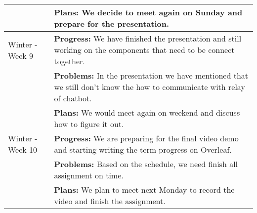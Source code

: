 \begin{longtable}[ht]{| p{1.5cm} | p{13.5cm} |}
     \\ & \textbf{Plans:}
     We decide to meet again on Sunday and prepare for the presentation.
     \\
     \hline
     Winter - Week 9 &
     \textbf{Progress:}
     We have finished the presentation and still working on the components that need to be connect together. 
     \\ & \textbf{Problems:}
     In the presentation we have mentioned that we still don't know the how to communicate with relay of chatbot. 
     \\ & \textbf{Plans:}
     We would meet again on weekend and discuss how to figure it out. 
     \\
     \hline
     Winter - Week 10 &
     \textbf{Progress:}
     We are preparing for the final video demo and starting writing the term progress on Overleaf. 
     \\ & \textbf{Problems:}
     Based on the schedule, we need finish all assignment on time.
     \\ & \textbf{Plans:}
     We plan to meet next Monday to record the video and finish the assignment. 
     \\
     \hline
\end{longtable}